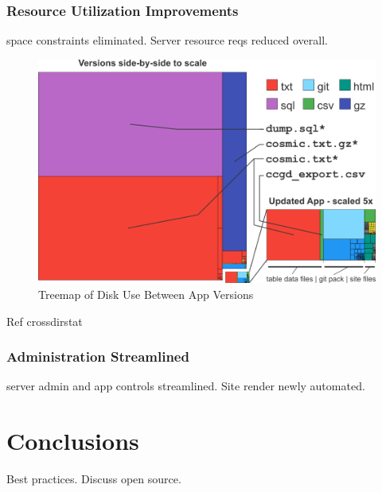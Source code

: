 \documentclass[10pt]{report}
\begin{document}
\subsection{Resource Utilization Improvements}
space constraints eliminated. Server resource reqs reduced overall.

\begin{figure}[H]
    \centering
    \includegraphics[width=\textwidth]{fig/space_tree.png}
    \caption{Treemap of Disk Use Between App Versions}\label{fig:spaceTree}
\end{figure}

Ref crossdirstat

\subsection{Administration Streamlined}
server admin and app controls streamlined. Site render newly automated.




\chapter{Conclusions}

Best practices. Discuss open source.

\printbibliography{}
\end{document}
